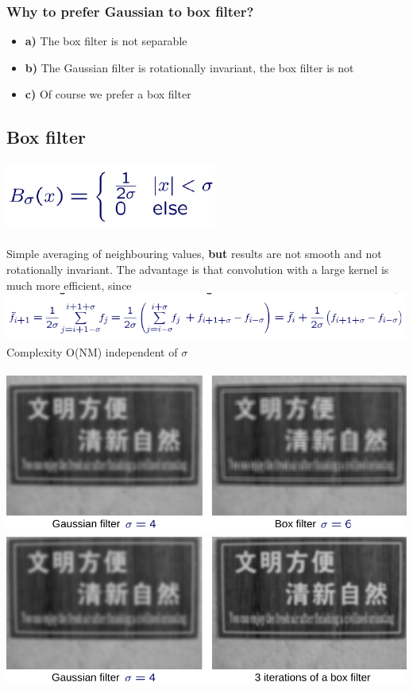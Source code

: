 \documentclass{article}
\begin{document}
\subsubsection{Why to prefer Gaussian to box filter?}
\begin{itemize}
    \item \textbf{a)} The box filter is not separable
    \item \textbf{b)} The Gaussian filter is rotationally invariant, the box filter is not
    \item \textbf{c)} Of course we prefer a box filter
\end{itemize}
\subsection{Box filter}
\includegraphics[scale=0.35]{22.png}\\\\
Simple averaging of neighbouring values, \textbf{but} results are not smooth and not rotationally invariant. The advantage is that convolution with a large kernel is much more efficient, since\\
\includegraphics[scale=0.35]{23.png}\\
Complexity O(NM) independent of $\sigma$\\\\
\includegraphics[scale=0.2]{24.png}
\includegraphics[scale=0.2]{25.png}\\\\
\end{document}
